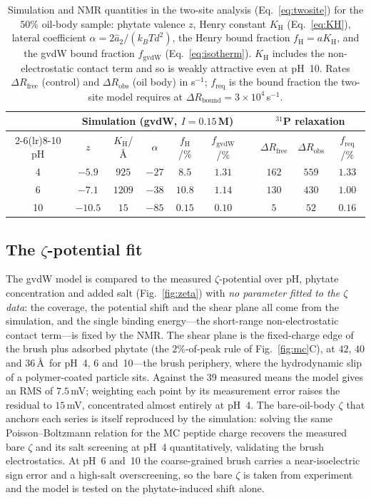 \documentclass[11pt]{article}
\begin{document}
\begin{table}[h]
\centering
\begin{tabular}{@{}c ccccc c ccc@{}}
\toprule
 & \multicolumn{5}{c}{Simulation (gvdW, $I=0.15$\,M)} & &
   \multicolumn{3}{c}{$^{31}$P relaxation} \\
\cmidrule(lr){2-6}\cmidrule(lr){8-10}
pH & $z$ & $K_\text{H}$/\AA & $\alpha$ & $f_\text{H}$/\% & $f_\text{gvdW}$/\% & &
 $\Delta R_\text{free}$ & $\Delta R_\text{obs}$ & $f_\text{req}$/\% \\
\midrule
4  & $-5.9$  & $925$  & $-27$ & $8.5$  & $1.31$ & & $162$ & $559$ & $1.33$ \\
6  & $-7.1$  & $1209$ & $-38$ & $10.8$ & $1.14$ & & $130$ & $430$ & $1.00$ \\
10 & $-10.5$ & $15$   & $-85$ & $0.15$ & $0.10$ & & $5$   & $52$  & $0.16$ \\
\bottomrule
\end{tabular}
\caption{Simulation and NMR quantities in the two-site analysis
  (Eq.~\ref{eq:twosite}) for the $50\%$ oil-body sample: phytate valence $z$,
  Henry constant $K_\text{H}$ (Eq.~\ref{eq:KH}), lateral coefficient $\alpha=2\hat
  a_2/(k_BT d^2)$, the Henry bound fraction $f_\text{H}=aK_\text{H}$, and the gvdW
  bound fraction $f_\text{gvdW}$ (Eq.~\ref{eq:isotherm}).  $K_\text{H}$ includes the
  non-electrostatic contact term and so is weakly attractive even at pH~10.  Rates
  $\Delta R_\text{free}$ (control) and $\Delta R_\text{obs}$ (oil body) in s$^{-1}$;
  $f_\text{req}$ is the bound fraction the two-site model requires at $\Delta
  R_\text{bound}=3\times10^{4}$\,s$^{-1}$.}
\label{tab:gvdw}
\end{table}

\subsection{The \texorpdfstring{$\zeta$}{zeta}-potential fit}

The gvdW model is compared to the measured $\zeta$-potential over
pH, phytate concentration and added salt (Fig.~\ref{fig:zeta}) with \emph{no
parameter fitted to the $\zeta$ data}: the coverage, the potential shift and the
shear plane all come from the simulation, and the single binding energy---the
short-range non-electrostatic contact term---is fixed by the NMR.  The shear plane
is the fixed-charge edge of the brush plus adsorbed phytate (the $2\%$-of-peak rule
of Fig.~\ref{fig:mc}C), at $42$, $40$ and $36$\,\AA\ for pH~4, 6 and~10---the brush
periphery, where the hydrodynamic slip of a polymer-coated particle sits.  Against
the 39 measured means the model gives an RMS of $7.5$\,mV; weighting each point by
its measurement error raises the residual to $15$\,mV, concentrated almost entirely
at pH~4.  The bare-oil-body $\zeta$ that anchors each series is itself reproduced by
the simulation: solving the same Poisson--Boltzmann relation for the MC peptide
charge recovers the measured bare $\zeta$ and its salt screening at pH~4
quantitatively, validating the brush electrostatics.  At pH~6 and~10 the
coarse-grained brush carries a near-isoelectric sign error and a high-salt
overscreening, so the bare $\zeta$ is taken from experiment and the model is tested
on the phytate-induced shift alone.
\end{document}
